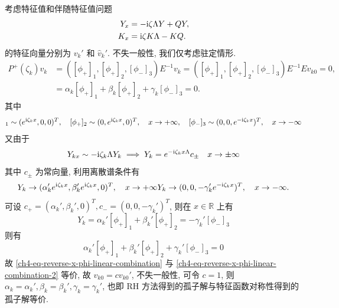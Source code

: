 考虑特征值和伴随特征值问题
\begin{equation}
    \begin{aligned}
        Y_{x} & = -\mathrm{i} \zeta \Lambda Y + Q Y, \\
        K_{x} & = \mathrm{i} \zeta K \Lambda - K Q.
    \end{aligned}
\end{equation}
的特征向量分别为 $v_{k}'$ 和 $\hat{v}_{k}'$. 不失一般性, 我们仅考虑驻定情形.
\begin{equation}
    \begin{aligned}
        P^{+}(\zeta_{k}) v_{k} & = ([\phi_{+}]_{1}, [\phi_{+}]_{2}, [\phi_{-}]_{3}) E^{-1} v_{k} = ([\phi_{+}]_{1}, [\phi_{+}]_{2}, [\phi_{-}]_{3}) E^{-1} E v_{k0} = 0, \\
                               & = \alpha_{k} [\phi_{+}]_{1} + \beta_{k} [\phi_{+}]_{2} + \gamma_{k} [\phi_{-}]_{3} = 0.
    \end{aligned}
    \label{ch4-eq-reverse-x-phi-linear-combination}
\end{equation}
其中
\begin{equation}
    [\phi_{+}]_{1} \sim (e^{\rmi \zeta_{k} x}, 0,0)^{T}, \quad [\phi_{+}]_{2} \sim (0, e^{\rmi \zeta_{k} x}, 0)^{T}, \quad x \to +\infty, \quad
    [\phi_{-}]_{3} \sim (0,0, e^{- \rmi \zeta_{k} x})^{T}, \quad x \to -\infty
\end{equation}
又由于
\begin{equation}
    Y_{kx} \sim -\mathrm{i} \zeta_{k} \Lambda Y_{k} \implies Y_{k} = e^{-\mathrm{i} \zeta_{k} x \Lambda} c_{\pm} \quad x \to \pm \infty
\end{equation}
其中 $c_{\pm}$ 为常向量, 利用离散谱条件有
\begin{equation}
    Y_{k} \to (\alpha_{k}' e^{\mathrm{i} \zeta_{k} x}, \beta_{k}' e^{\mathrm{i} \zeta_{k} x},0)^{T}, \quad x \to +\infty \\
    Y_{k} \to (0,0, -\gamma_{k}' e^{- \mathrm{i} \zeta_{k} x})^{T}, \quad x \to -\infty.
\end{equation}
可设 $c_{+} = (\alpha_{k}', \beta_{k}', 0)^{T}, c_{-} = (0,0, - \gamma_{k}')^{T}$, 则在 $x \in \mathbb{R}$ 上有
\begin{equation}
    Y_{k} = \alpha_{k}' [\phi_{+}]_{1} + \beta_{k}' [\phi_{+}]_{2} = -\gamma_{k}' [\phi_{-}]_{3}
\end{equation}
则有
\begin{equation}
    \alpha_{k}' [\phi_{+}]_{1} + \beta_{k}' [\phi_{+}]_{2} + \gamma_{k}' [\phi_{-}]_{3} = 0
    \label{ch4-eq-reverse-x-phi-linear-combination-2}
\end{equation}
故 \eqref{ch4-eq-reverse-x-phi-linear-combination} 与 \eqref{ch4-eq-reverse-x-phi-linear-combination-2} 等价, 故 $ v_{k0} = c v_{k0}'$, 不失一般性, 可令 $c=1$, 则 $\alpha_{k} = \alpha_{k}', \beta_{k} = \beta_{k}', \gamma_{k} = \gamma_{k}'$, 也即 RH 方法得到的孤子解与特征函数对称性得到的孤子解等价.


